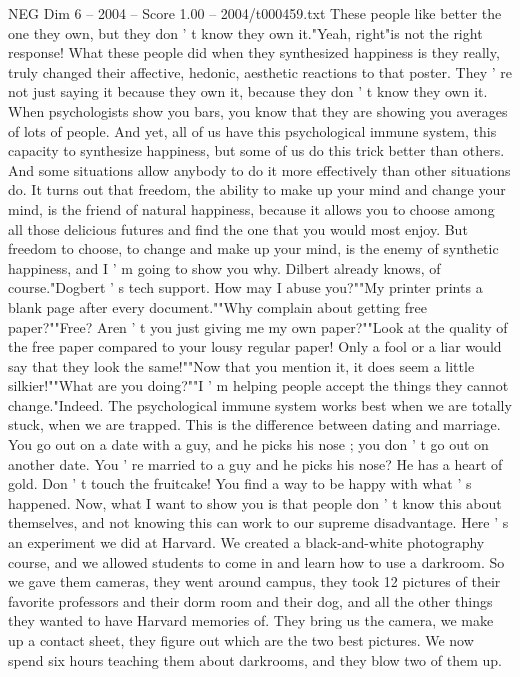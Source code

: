 \begin{textsample}{NEG Dim 6 – 2004 – Score 1.00 – 2004/t000459.txt}
These people like better the one they own, but they don ' t know they own it."Yeah, right"is not the right response!
What these people did when they synthesized happiness is they really, truly changed their affective, hedonic, aesthetic reactions to that poster.
They ' re not just saying it because they own it, because they don ' t know they own it.
When psychologists show you bars, you know that they are showing you averages of lots of people.
And yet, all of us have this psychological immune system, this capacity to synthesize happiness, but some of us do this trick better than others.
And some situations allow anybody to do it more effectively than other situations do.
It turns out that freedom, the ability to make up your mind and change your mind, is the friend of natural happiness, because it allows you to choose among all those delicious futures and find the one that you would most enjoy.
But freedom to choose, to change and make up your mind, is the enemy of synthetic happiness, and I ' m going to show you why.
Dilbert already knows, of course."Dogbert ' s tech support.
How may I abuse you?""My printer prints a blank page after every document.""Why complain about getting free paper?""Free?
Aren ' t you just giving me my own paper?""Look at the quality of the free paper compared to your lousy regular paper!
Only a fool or a liar would say that they look the same!""Now that you mention it, it does seem a little silkier!""What are you doing?""I ' m helping people accept the things they cannot change."Indeed.
The psychological immune system works best when we are totally stuck, when we are trapped.
This is the difference between dating and marriage.
You go out on a date with a guy, and he picks his nose ; you don ' t go out on another date.
You ' re married to a guy and he picks his nose?
He has a heart of gold.
Don ' t touch the fruitcake!
You find a way to be happy with what ' s happened.
Now, what I want to show you is that people don ' t know this about themselves, and not knowing this can work to our supreme disadvantage.
Here ' s an experiment we did at Harvard.
We created a black-and-white photography course, and we allowed students to come in and learn how to use a darkroom.
So we gave them cameras, they went around campus, they took 12 pictures of their favorite professors and their dorm room and their dog, and all the other things they wanted to have Harvard memories of.
They bring us the camera, we make up a contact sheet, they figure out which are the two best pictures.
We now spend six hours teaching them about darkrooms, and they blow two of them up.

\end{textsample}
